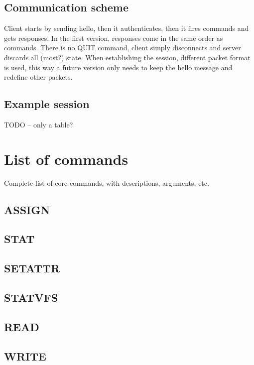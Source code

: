 %

\subsection{Communication scheme}

Client starts by sending hello, then it authenticates, then it fires commands and gets responses.  In the
first version, responses come in the same order as commands. There is no QUIT command, client simply
disconnects and server discards all (most?) state. When establishing the session, different packet format is
used, this way a future version only needs to keep the hello message and redefine other packets.

%

\subsection{Example session}

TODO -- only a table?


\section{List of commands}

Complete list of core commands, with descriptions, arguments, etc.

\subsection{ASSIGN}

\subsection{STAT}

\subsection{SETATTR}

\subsection{STATVFS}

\subsection{READ}

\subsection{WRITE}

